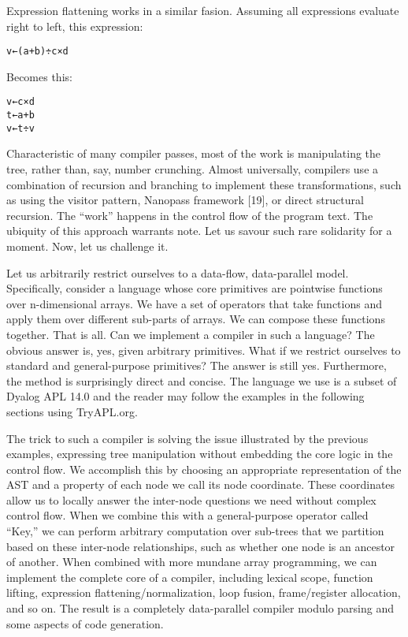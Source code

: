 \documentclass[pldi]{sigplanconf-pldi15}
\begin{document}
Expression flattening works in a similar fasion. Assuming all expressions evaluate right to left, this expression:

\begin{verbatim}
v←(a+b)÷c×d
\end{verbatim}

Becomes this:

\begin{verbatim}
v←c×d
t←a+b
v←t÷v
\end{verbatim}

Characteristic of many compiler passes, most of the work is manipulating the tree, rather than, say, number 
crunching. Almost universally, compilers use a combination of recursion and branching to implement these 
transformations, such as using the visitor pattern, Nanopass framework [19], or direct structural recursion. 
The “work” happens in the control flow of the program text. The ubiquity of this approach warrants note. 
Let us savour such rare solidarity for a moment. Now, let us challenge it. 

Let us arbitrarily restrict ourselves to a data-flow, data-parallel model. Specifically, consider a language 
whose core primitives are pointwise functions over n-dimensional arrays. We have a set of operators that 
take functions and apply them over different sub-parts of arrays. We can compose these functions together. 
That is all. Can we implement a compiler in such a language? The obvious answer is, yes, given arbitrary 
primitives. What if we restrict ourselves to standard and general-purpose primitives? The answer is still 
yes. Furthermore, the method is surprisingly direct and concise. The language we use is a subset of Dyalog 
APL 14.0 and the reader may follow the examples in the following sections using TryAPL.org. 

The trick to such a compiler is solving the issue illustrated by the previous examples, expressing tree 
manipulation without embedding the core logic in the control flow. We accomplish this by choosing an 
appropriate representation of the AST and a property of each node we call its node coordinate. These 
coordinates allow us to locally answer the inter-node questions we need without complex control flow. When 
we combine this with a general-purpose operator called “Key,” we can perform arbitrary computation over 
sub-trees that we partition based on these inter-node relationships, such as whether one node is an ancestor 
of another. When combined with more mundane array programming, we can implement the complete core of a 
compiler, including lexical scope, function lifting, expression flattening/normalization, loop fusion, 
frame/register allocation, and so on. The result is a completely data-parallel compiler modulo parsing and 
some aspects of code generation.
\end{document}
